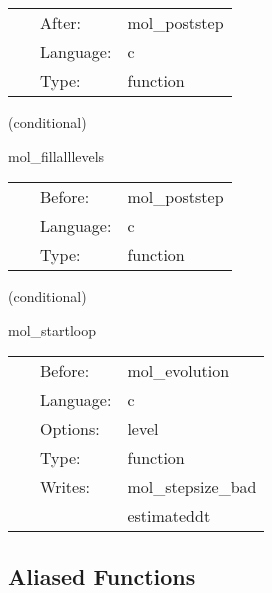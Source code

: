  \begin{tabular*}{160mm}{cll} 
~ & After:  & mol\_poststep \\ 
~ & Language:  & c \\ 
~ & Type:  & function \\ 
\end{tabular*} 


\vspace{5mm}

   (conditional) 

\hspace{5mm} mol\_fillalllevels 

\hspace{5mm}{\it a bad routine. fills all previous timelevels with data copied from the current. } 


\hspace{5mm}

 \begin{tabular*}{160mm}{cll} 
~ & Before:  & mol\_poststep \\ 
~ & Language:  & c \\ 
~ & Type:  & function \\ 
\end{tabular*} 


\vspace{5mm}

   (conditional) 

\hspace{5mm} mol\_startloop 

\hspace{5mm}{\it initialise the step size control } 


\hspace{5mm}

 \begin{tabular*}{160mm}{cll} 
~ & Before:  & mol\_evolution \\ 
~ & Language:  & c \\ 
~ & Options:  & level \\ 
~ & Type:  & function \\ 
~ & Writes:  & mol\_stepsize\_bad \\ 
~& ~ &estimateddt\\ 
\end{tabular*} 


\subsection*{Aliased Functions}

